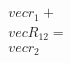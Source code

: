 \documentclass[preview]{standalone}
\begin{document}
\begin{align*}
\quad\\vec{r}_1 + \quad\\vec{R}_{12} = \quad\\vec{r}_2
\end{align*}
\end{document}
